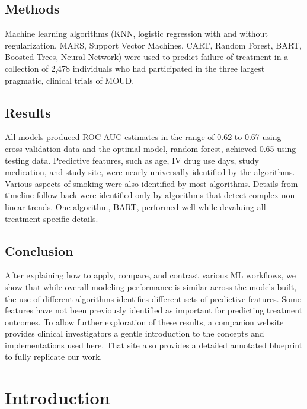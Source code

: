 \documentclass[
  number,
  preprint,
  3p,
  onecolumn]{elsarticle}
\begin{document}
\subsection{Methods}\label{methods}

Machine learning algorithms (KNN, logistic regression with and without
regularization, MARS, Support Vector Machines, CART, Random Forest,
BART, Boosted Trees, Neural Network) were used to predict failure of
treatment in a collection of 2,478 individuals who had participated in
the three largest pragmatic, clinical trials of MOUD.

\subsection{Results}\label{results}

All models produced ROC AUC estimates in the range of 0.62 to 0.67 using
cross-validation data and the optimal model, random forest, achieved
0.65 using testing data. Predictive features, such as age, IV drug use
days, study medication, and study site, were nearly universally
identified by the algorithms. Various aspects of smoking were also
identified by most algorithms. Details from timeline follow back were
identified only by algorithms that detect complex non-linear trends. One
algorithm, BART, performed well while devaluing all treatment-specific
details.

\subsection{Conclusion}\label{conclusion}

After explaining how to apply, compare, and contrast various ML
workflows, we show that while overall modeling performance is similar
across the models built, the use of different algorithms identifies
different sets of predictive features. Some features have not been
previously identified as important for predicting treatment outcomes. To
allow further exploration of these results, a companion website provides
clinical investigators a gentle introduction to the concepts and
implementations used here. That site also provides a detailed annotated
blueprint to fully replicate our work.

\section{Introduction}\label{introduction}
\end{document}
